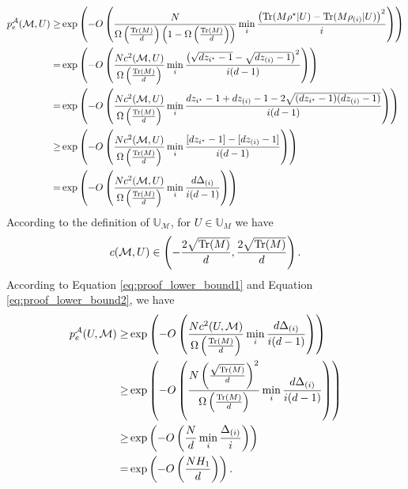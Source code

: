     \begin{equation}\label{eq:proof_lower_bound1}
        \begin{aligned}
             p_e^\mathcal{A}(\mathcal{M},U) \geq & \exp\left(-O\left( \frac{N}{\Omega\left(\frac{\mathrm{Tr}(M)}{d}\right)\left(1-\Omega\left(\frac{\mathrm{Tr}(M)}{d}\right)\right)}\min_i \frac{\left(\mathrm{Tr}(M\rho^\star|U) - \mathrm{Tr}(M\rho_{(i)}|U)\right)^2}{i}\right)\right) \\
            = & \exp\left(-O\left( \frac{N c^2(\mathcal{M},U)}{\Omega\left(\frac{\mathrm{Tr}(M)}{d}\right)}\min_i \frac{\left(\sqrt{dz_{i^\star} -1} - \sqrt{dz_{(i)} -1}\right)^2}{i(d-1)}\right)\right) \\
            = & \exp\left(-O\left( \frac{N c^2(\mathcal{M},U)}{\Omega\left(\frac{\mathrm{Tr}(M)}{d}\right)}\min_i \frac{dz_{i^\star}-1 + dz_{(i)}-1 -2\sqrt{(dz_{i^\star}-1)(dz_{(i)}-1)}}{i(d-1)}\right)\right) \\
            \geq & \exp\left(-O\left( \frac{N c^2(\mathcal{M},U)}{\Omega\left(\frac{\mathrm{Tr}(M)}{d}\right)}\min_i \frac{[dz_{i^\star}-1] - [dz_{(i)}-1]}{i(d-1)}\right)\right) \\
            = & \exp\left(-O\left( \frac{N c^2(\mathcal{M},U)}{\Omega\left(\frac{\mathrm{Tr}(M)}{d}\right)}\min_i \frac{d\Delta_{(i)}}{i(d-1)}\right)\right) \\
        \end{aligned} 
    \end{equation}
    According to the definition of $\mathbb{U}_\mathcal{M}$, for $U \in \mathbb{U}_M$ we have 
    \begin{equation} \label{eq:proof_lower_bound2}
        c(\mathcal{M},U) \in \left(-\frac{2\sqrt{\mathrm{Tr}(M)}}{d}, \frac{2\sqrt{\mathrm{Tr}(M)}}{d}\right).
    \end{equation}
    According to Equation \eqref{eq:proof_lower_bound1} and Equation \eqref{eq:proof_lower_bound2}, we have
    \begin{equation}
    \label{eq2:proof_lower_bound}
        \begin{aligned}
            p_e^\mathcal{A}(U,\mathcal{M}) \geq & \exp\left(-O\left( \frac{N c^2(U,\mathcal{M})}{\Omega\left(\frac{\mathrm{Tr}(M)}{d}\right)}\min_i \frac{d\Delta_{(i)}}{i(d-1)}\right)\right) \\
            \geq & \exp\left(-O\left( \frac{N \left(\frac{\sqrt{\mathrm{Tr}(M)}}{d}\right)^2}{\Omega\left(\frac{\mathrm{Tr}(M)}{d}\right)}\min_i \frac{d\Delta_{(i)}}{i(d-1)}\right)\right) \\
            \geq & \exp\left(-O\left( \frac{N}{d}\min_i \frac{\Delta_{(i)}}{i}\right)\right) \\
            = & \exp\left(-O\left( \frac{NH_1}{d}\right)\right).
        \end{aligned}
    \end{equation}
